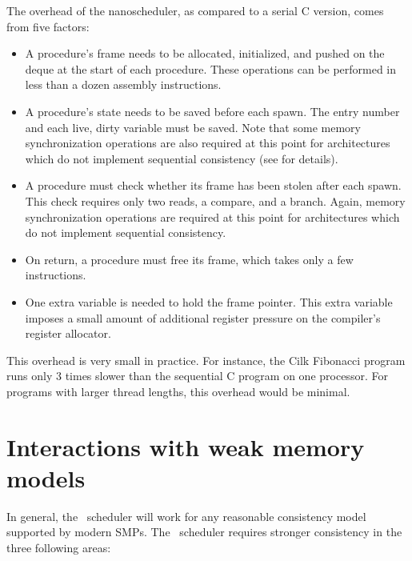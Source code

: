 The overhead of the nanoscheduler, as compared to a serial C version,
comes from five factors:
\begin{itemize}

\item A procedure's frame needs to be allocated, initialized, and
pushed on the deque at the start of each procedure.  These operations
can be performed in less than a dozen assembly instructions.

\item A procedure's state needs to be saved before each spawn.  The
entry number and each live, dirty variable must be saved.  Note that
some memory synchronization operations are also required at this point
for architectures which do not implement sequential consistency (see
 for details).

\item A procedure must check whether its frame has been stolen after
each spawn.  This check requires only two reads, a compare, and a
branch.  Again, memory synchronization operations are required at this
point for architectures which do not implement sequential consistency.

\item On return, a procedure must free its frame, which takes only a
few instructions.

\item One extra variable is needed to hold the frame pointer.  This
extra variable imposes a small amount of additional register pressure
on the compiler's register allocator.

\end{itemize}

This overhead is very small in practice.  For instance, the Cilk
Fibonacci program runs only $3$ times slower than the sequential C
program on one processor.  For programs with larger thread lengths,
this overhead would be minimal.


\section{Interactions with weak memory models}
\label{sec:weak-mem-interaction}

In general, the \sysnameversion\ scheduler will work for any reasonable
consistency model supported by modern SMPs.  The \sysname\ scheduler
requires stronger consistency in the three following areas:

